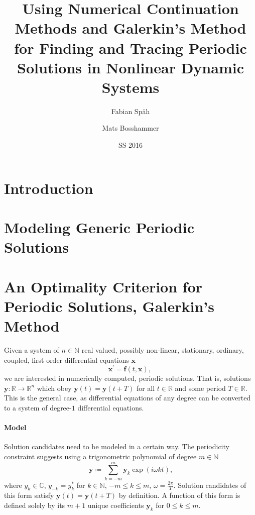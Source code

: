 \documentclass[a4paper,oneside,10pt]{article}
\newcommand\R{\mathbb{R}}
\newcommand\N{\mathbb{N}}
\newcommand\C{\mathbb{C}}
\let\oldsection\section
\renewcommand\section{\clearpage\oldsection}
\begin{document}
\title{Using Numerical Continuation Methods and Galerkin's Method for Finding and Tracing Periodic Solutions in Nonlinear Dynamic Systems} %
\author{Fabian Späh \and Mats Bosshammer}
\date{SS 2016}
\maketitle
\thispagestyle{empty} %



\pagebreak

\thispagestyle{empty} %
\raggedbottom
\tableofcontents %

\pagebreak
\pagestyle{plain} %
\flushbottom



\section{Introduction}



\section{Modeling Generic Periodic Solutions}


\section{An Optimality Criterion for Periodic Solutions, Galerkin's Method}

Given a system of $n \in \N$ real valued, possibly non-linear, stationary, ordinary, coupled, first-order differential equations $\textbf{x}$
\[
	\textbf{x}^\prime = \textbf{f}(t, \textbf{x}) \text{, }
\]
we are interested in numerically computed, periodic solutions.
That is, solutions $\textbf{y}: \R \to \R^n$ which obey $\textbf{y}(t) = \textbf{y}(t+T)$ for all $t \in \R$ and some period $T \in \R$.
This is the general case, as differential equations of any degree can be converted to a system of degree-$1$ differential equations.

\paragraph{Model} Solution candidates need to be modeled in a certain way.
The periodicity constraint suggests using a trigonometric polynomial of degree $m \in \N$
\[
	\textbf{y} \coloneqq \sum_{k = -m}^m \textbf{y}_k \exp\left(i \omega k t\right) \text{,}
\]
where $y_k \in \C$, $y_{-k} = y_k^*$ for $k \in \N$, $-m \le k \le m$, $\omega = \frac{2\pi}T$.
Solution candidates of this form satisfy $\textbf{y}(t) = \textbf{y}(t+T)$ by definition.
A function of this form is defined solely by its $m+1$ unique coefficients $\textbf{y}_k$ for $0 \le k \le m$.
\end{document}
